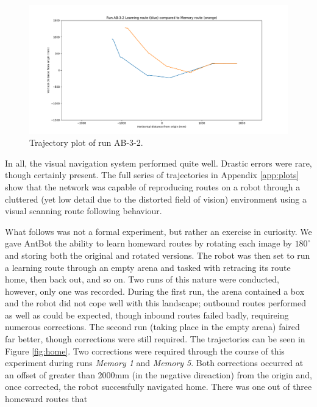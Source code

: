 \documentclass[a4paper,11pt,twoside,openright]{article}
\begin{document}
\begin{figure}
 \centering
  \includegraphics[width=\textwidth]{AB-3-2}
  \caption{
    \label{fig:ab-3-2-inside} Trajectory plot of run AB-3-2.
  }
\end{figure}

In all, the visual navigation system performed quite well. Drastic errors were rare, though certainly present. The full series
of trajectories in Appendix \ref{app:plots} show that the network was capable of reproducing routes on a robot through a
cluttered (yet low detail due to the distorted field of vision) environment using a visual scanning route following behaviour.
\newline

What follows was not a formal experiment, but rather an exercise in curiosity. We gave AntBot the ability to learn homeward
routes by rotating each image by $180^{\circ}$ and storing both the original and rotated versions. The robot was then set
to run a learning route through an empty arena and tasked with retracing its route home, then back out, and so on. Two runs
of this nature were conducted, however, only one was recorded. During the first run, the arena contained a box and the
robot did not cope well with this landscape; outbound routes performed as well as could be expected, though inbound routes
failed badly, requireing numerous corrections. The second run (taking place in the empty arena) faired far better, though
corrections were still required. The trajectories can be seen in Figure \ref{fig:home}. Two corrections were required
through the course of this experiment during runs \textit{Memory 1} and \textit{Memory 5}. Both corrections occurred
at an offset of greater than 2000mm (in the negative direaction) from the origin and, once corrected, the robot successfully
navigated home. There was one out of three homeward routes that  
\end{document}
